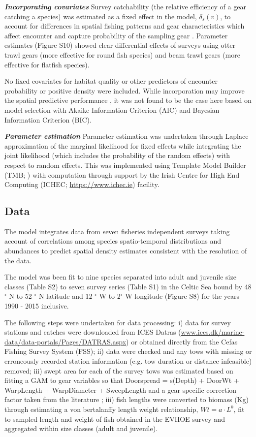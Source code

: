 \documentclass{nature}
\begin{document}
\begin{linenumbers}
\textbf{\textit{Incorporating covariates}} Survey catchability (the relative
efficiency of a gear catching a species) was estimated as a fixed effect in the
model, $\delta_{s}(v)$, to account for differences in spatial fishing patterns
and gear characteristics which affect encounter and capture probability of the
sampling gear \cite{Thorson2014}. Parameter estimates (Figure S10) showed clear
differential effects of surveys using otter trawl gears (more effective for
round fish species) and beam trawl gears (more effective for flatfish species).

No fixed covariates for habitat quality or other predictors of encounter
probability or positive density were included. While incorporation may improve
the spatial predictive performance \cite{Thorson2017}, it was not found to be
the case here based on model selection with Akaike Information Criterion (AIC)
and Bayesian Information Criterion (BIC).

\textbf{\textit{Parameter estimation}} Parameter estimation was undertaken
through Laplace approximation of the marginal likelihood for fixed effects
while integrating the joint likelihood (which includes the probability of the
random effects) with respect to random effects. This was implemented using
Template Model Builder (TMB; \cite{Kristensen2015}) with computation through
support by the Irish Centre for High End Computing (ICHEC;
\url{https://www.ichec.ie}) facility.  

\subsection{Data}

The model integrates data from seven fisheries independent surveys taking
account of correlations among species spatio-temporal distributions and
abundances to predict spatial density estimates consistent with the resolution
of the data. 

The model was been fit to nine species separated into adult and juvenile size
classes (Table S2) to seven survey series (Table S1) in the Celtic Sea bound by
48$^{\circ}$ N to 52 $^{\circ}$ N latitude and 12 $^{\circ}$ W to 2$^{\circ}$ W
longitude (Figure S8) for the years 1990 - 2015 inclusive. 

The following steps were undertaken for data processing: i) data for survey
stations and catches were downloaded from ICES Datras
(\url{www.ices.dk/marine-data/data-portals/Pages/DATRAS.aspx}) or obtained
directly from the Cefas Fishing Survey System (FSS); ii) data were checked and
any tows with missing or erroneously recorded station information (e.g. tow
duration or distance infeasible) removed; iii) swept area for each of the
survey tows was estimated based on fitting a GAM to gear variables so that
Doorspread = s(Depth) + DoorWt + WarpLength + WarpDiameter + SweepLength and a
gear specific correction factor taken from the literature \cite{Piet2009}; iii)
fish lengths were converted to biomass (Kg) through estimating a von
bertalanffy length weight relationship, $Wt = a \cdot L^{b}$, fit to sampled
length and weight of fish obtained in the EVHOE survey and aggregated within
size classes (adult and juvenile). 


\end{linenumbers}
\end{document}

